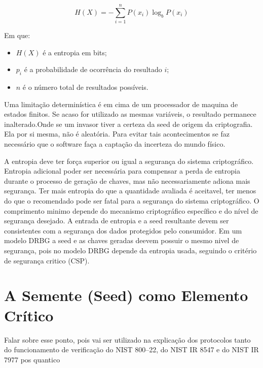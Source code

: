         \begin{equation}
            H(X) = - \sum_{i=1}^{n} P(x_i) \log_b P(x_i)
            \label{eq:shannon_entropy}
        \end{equation}

        Em que:
        \begin{itemize}
            \item $H(X)$ é a entropia em bits;
            \item $p_i$ é a probabilidade de ocorrência do resultado $i$;
            \item $n$ é o número total de resultados possíveis.
        \end{itemize}

        Uma limitação determinística é em cima de um processador de maquina de estados finitos.
        Se acaso for utilizado as mesmas variáveis, o resultado permanece inalterado.\@ Onde se um invasor 
        tiver a certeza da seed de origem da criptografia. Ela por si mesma, não é aleatória. Para evitar tais acontecimentos
        se faz necessário que o software faça a captação da incerteza do mundo físico.

        A entropia deve ter força superior ou igual a segurança do sistema criptográfico. 
        Entropia adicional poder ser necessária para compensar a perda de entropia durante o processo de geração de chaves, mas não necessariamente adiona mais segurança.
        Ter mais entropia do que a quantidade avaliada é aceitavel, ter menos do que o recomendado pode ser fatal para a segurança do sistema criptográfico. 
        O comprimento minimo depende do mecanismo criptográfico específico e do nível de segurança desejado.
        A entrada de entropia e a seed resultante devem ser consistentes com a segurança dos dados protegidos pelo consumidor. 
        Em um modelo DRBG a seed e as chaves geradas deevem possuir o mesmo nivel de segurança, pois no modelo DRBG depende da entropia usada, seguindo o critério de segurança critico (CSP).%

    \section{A Semente (Seed) como Elemento Crítico}

        Falar sobre esse ponto, pois vai ser utilizado na explicação dos protocolos tanto do funcionamento de verificação do NIST 800--22, do NIST IR 8547 e do NIST IR 7977 pos quantico 

